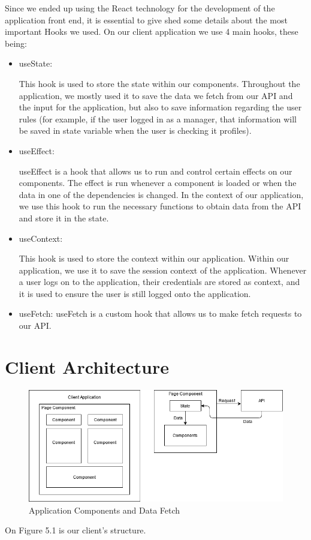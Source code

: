 \documentclass[a4paper,twoside,10pt]{report}
\begin{document}
Since we ended up using the React technology for the development of the application front end, it is essential to give shed some details about the most important Hooks we used.
\newline
On our client application we use 4 main hooks, these being:
\newpage
 \begin{itemize}
	\item useState\cite{USESTATE}:

This hook is used to store the state within our components. Throughout the application, we mostly used it to save the data we fetch from our API and the input for the application, but also to save information regarding the user rules (for example, if the user logged in as a manager, that information will be saved in state variable when the user is checking it profiles).
	\item useEffect\cite{USEEFFECT}:

useEffect is a hook that allows us to run and control certain effects on our components. The effect is run whenever a component is loaded or when the data in one of the dependencies is changed. In the context of our application, we use this hook to run the necessary functions to obtain data from the API and store it in the state.
	\item useContext\cite{USECONTEXT}:

This hook is used to store the context within our application. Within our application, we use it to save the session context of the application. Whenever a user logs on to the application, their credentials are stored as context, and it is used to ensure the user is still logged onto the application.
	\item useFetch\cite{USEFETCH}: useFetch is a custom hook that allows us to make fetch requests to our API.
\end{itemize}

\section{Client Architecture}
\begin{figure}[h!]
\center
  \includegraphics[width=\textwidth]{client app architecture.png}
\caption{Application Components and Data Fetch}
\end{figure}
On Figure 5.1 is our client's structure. 
\end{document}
